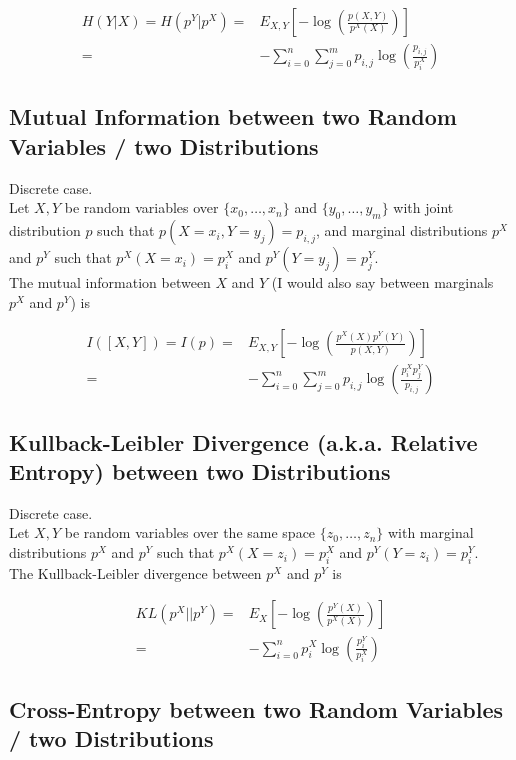 \documentclass{article}
\begin{document}
\begin{eqnarray*}
	H(Y|X) = H(p^Y|p^X) =& E_{X,Y}[-\log(\frac{p(X,Y)}{p^X(X)})] \\
	=& - \sum_{i=0}^n \sum_{j=0}^m p_{i,j} \log(\frac{p_{i,j}}{p^X_i})
\end{eqnarray*}


\subsection{Mutual Information between two Random Variables / two  Distributions}
Discrete case.\\
Let $X,Y$ be  random variables over $\{x_0, \dots, x_n\}$ and $\{y_0, \dots, y_m\}$ with joint distribution $p$ such that $p(X=x_i,Y=y_j) = p_{i,j}$, and marginal distributions $p^X$ and $p^Y$ such that $p^X(X = x_i) = p^X_i$ and $p^Y(Y = y_j) = p^Y_j$.\\
The mutual information between $X$ and $Y$ (I would also say between marginals $p^X$ and $p^Y$) is

\begin{eqnarray*}
    I([X,Y]) = I(p) =& E_{X,Y}[-\log(\frac{p^X(X)p^Y(Y)}{p(X,Y)})] \\
                    =& - \sum_{i=0}^n \sum_{j=0}^m p_{i,j} \log(\frac{p^X_i p^Y_j}{p_{i,j}})
\end{eqnarray*}



\subsection{Kullback-Leibler Divergence (a.k.a. Relative Entropy) between two Distributions}

Discrete case.\\
Let $X,Y$ be  random variables over the same space  $\{z_0, \dots, z_n\}$  with  marginal distributions $p^X$ and $p^Y$ such that $p^X(X = z_i) = p^X_i$ and $p^Y(Y = z_i) = p^Y_i$.\\
The Kullback-Leibler divergence between $p^X$ and $p^Y$ is

\begin{eqnarray*}
    KL(p^X||p^Y) =& E_{X}[-\log(\frac{p^Y(X)}{p^X(X)})] \\
                    =& - \sum_{i=0}^n  p^X_{i} \log(\frac{p^Y_i}{p^X_i})
\end{eqnarray*}


\subsection{Cross-Entropy between two Random Variables / two Distributions}
\end{document}
